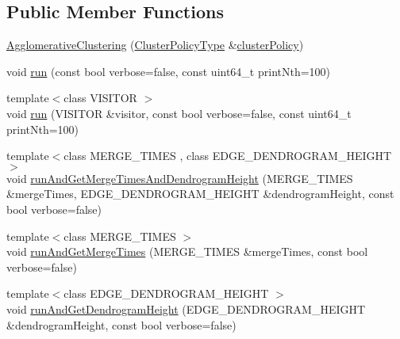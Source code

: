 \subsection*{Public Member Functions}
\begin{DoxyCompactItemize}
\item 
\hyperlink{classnifty_1_1graph_1_1agglo_1_1AgglomerativeClustering_a4c1ae55dc3568df3f2e0ffe9e34963df}{Agglomerative\+Clustering} (\hyperlink{classnifty_1_1graph_1_1agglo_1_1AgglomerativeClustering_a3a678ecd37725f2c0f8ec56857768034}{Cluster\+Policy\+Type} \&\hyperlink{classnifty_1_1graph_1_1agglo_1_1AgglomerativeClustering_a5e68685d164d4f6104bd40c29eca0c08}{cluster\+Policy})
\item 
void \hyperlink{classnifty_1_1graph_1_1agglo_1_1AgglomerativeClustering_a736c7ce881d0a8a1d305cf2c8746c744}{run} (const bool verbose=false, const uint64\+\_\+t print\+Nth=100)
\item 
{\footnotesize template$<$class V\+I\+S\+I\+T\+OR $>$ }\\void \hyperlink{classnifty_1_1graph_1_1agglo_1_1AgglomerativeClustering_a6fac3d0b742ab08e8befb34646bafe80}{run} (V\+I\+S\+I\+T\+OR \&visitor, const bool verbose=false, const uint64\+\_\+t print\+Nth=100)
\item 
{\footnotesize template$<$class M\+E\+R\+G\+E\+\_\+\+T\+I\+M\+ES , class E\+D\+G\+E\+\_\+\+D\+E\+N\+D\+R\+O\+G\+R\+A\+M\+\_\+\+H\+E\+I\+G\+HT $>$ }\\void \hyperlink{classnifty_1_1graph_1_1agglo_1_1AgglomerativeClustering_af5d353cca095be5cd67614c3d5267eea}{run\+And\+Get\+Merge\+Times\+And\+Dendrogram\+Height} (M\+E\+R\+G\+E\+\_\+\+T\+I\+M\+ES \&merge\+Times, E\+D\+G\+E\+\_\+\+D\+E\+N\+D\+R\+O\+G\+R\+A\+M\+\_\+\+H\+E\+I\+G\+HT \&dendrogram\+Height, const bool verbose=false)
\item 
{\footnotesize template$<$class M\+E\+R\+G\+E\+\_\+\+T\+I\+M\+ES $>$ }\\void \hyperlink{classnifty_1_1graph_1_1agglo_1_1AgglomerativeClustering_a9c8d18e03cef48ba261ba8e8a1bcc924}{run\+And\+Get\+Merge\+Times} (M\+E\+R\+G\+E\+\_\+\+T\+I\+M\+ES \&merge\+Times, const bool verbose=false)
\item 
{\footnotesize template$<$class E\+D\+G\+E\+\_\+\+D\+E\+N\+D\+R\+O\+G\+R\+A\+M\+\_\+\+H\+E\+I\+G\+HT $>$ }\\void \hyperlink{classnifty_1_1graph_1_1agglo_1_1AgglomerativeClustering_adf2c89066a4796c32e722c7244b37f3c}{run\+And\+Get\+Dendrogram\+Height} (E\+D\+G\+E\+\_\+\+D\+E\+N\+D\+R\+O\+G\+R\+A\+M\+\_\+\+H\+E\+I\+G\+HT \&dendrogram\+Height, const bool verbose=false)

\end{DoxyCompactItemize}
